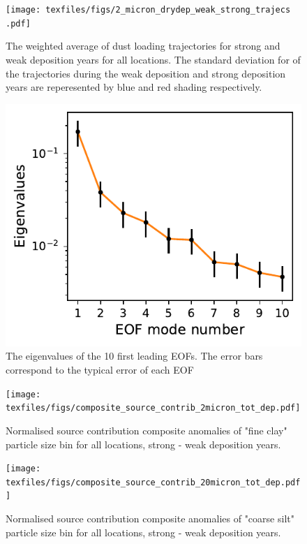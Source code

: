 \begin{figure}[htbp]
    \centering
    \texttt{[image: texfiles/figs/2\_micron\_drydep\_weak\_strong\_trajecs .pdf]}
    \caption{The weighted average of dust loading trajectories for strong and weak deposition years for all locations. The standard deviation for of the trajectories during the weak deposition and strong deposition years are reperesented by blue and red shading respectively.  }
    \label{fig:strong_weak_depo_year_2mmu_trajecs}
\end{figure}
\begin{figure}[htbp]
    \centering
    \includegraphics[scale=0.7]{texfiles/figs/EOF_north_test.pdf}
    \caption{The eigenvalues of the 10 first leading EOFs. The error bars correspond to the typical error of each EOF}
    \label{fig:eof_test}
\end{figure}






\begin{figure}[hptb]
    \centering
    \texttt{[image: texfiles/figs/composite\_source\_contrib\_2micron\_tot\_dep.pdf]}
    \caption{Normalised source contribution composite anomalies of "fine clay" particle size bin for all locations, strong - weak deposition years.}
    \label{fig:source_contrib2mmu_anomalies}
\end{figure}

\begin{figure}[hptb]
    \centering
    \texttt{[image: texfiles/figs/composite\_source\_contrib\_20micron\_tot\_dep.pdf]}
    \caption{Normalised source contribution composite anomalies of "coarse silt" particle size bin for all locations, strong - weak deposition years.}
    \label{fig:source_contrib20mmu_anomalies}
\end{figure}

